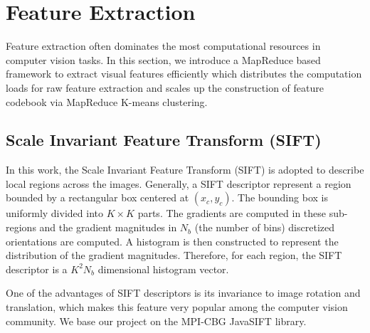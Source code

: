 \documentclass{acm_proc_article-sp}
\begin{document}
\section{Feature Extraction}\label{sec:feature}
Feature extraction often dominates the most computational resources in computer vision tasks. In this section, we introduce a MapReduce based framework to extract visual features efficiently which distributes the computation loads for raw feature extraction and scales up the construction of feature codebook via MapReduce K-means clustering.
\subsection{Scale Invariant Feature Transform (SIFT)}
In this work, the Scale Invariant Feature Transform (SIFT) \cite{sift} is adopted to describe local regions across the images. Generally, a SIFT descriptor represent a region bounded by a rectangular box centered at $(x_c,y_c)$. The bounding box is uniformly divided into $K\times K$ parts. The gradients are computed in these sub-regions and the gradient magnitudes in $N_b$ (the number of bins) discretized orientations  are computed. A histogram is then constructed to represent the distribution of the gradient magnitudes. Therefore, for each region, the SIFT descriptor is a $K^2N_b$ dimensional histogram vector.

One of the advantages of SIFT descriptors is its invariance to image rotation and translation, which makes this feature very popular among the computer vision community. We base our project on the MPI-CBG JavaSIFT library\cite{mpicbg}.
\end{document}
